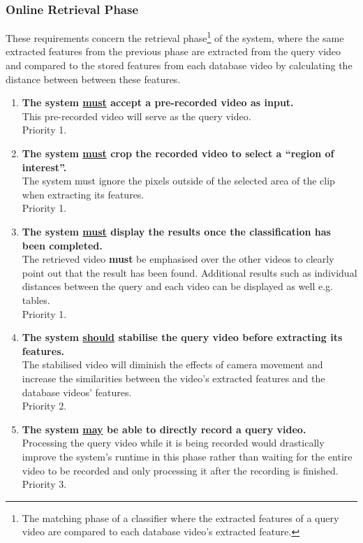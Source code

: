 \subsubsection{Online Retrieval Phase}

These requirements concern the retrieval phase\footnote{The matching phase of a classifier where the extracted features of a query video are compared to each database video's extracted feature.} of the system, where the same extracted features from the previous phase are extracted from the query video and compared to the stored features from each database video by calculating the distance between between these features.

\begin{enumerate}[label=F\arabic*,resume]

    \item \textbf{The system \underline{must} accept a pre-recorded video as input.}\\
    This pre-recorded video will serve as the query video.\\
    Priority 1.
    
    \item \textbf{The system \underline{must} crop the recorded video to select a ``region of interest''.}\\
    The system must ignore the pixels outside of the selected area of the clip when extracting its features.\\
    Priority 1.
    
    \item \textbf{The system \underline{must} display the results once the classification has been completed.}\\
    The retrieved video \textbf{must} be emphasised over the other videos to clearly point out that the result has been found. Additional results such as individual distances between the query and each video can be displayed as well e.g. tables.\\
    Priority 1.
    
    \item \textbf{The system \underline{should} stabilise the query video before extracting its features.}\\
    The stabilised video will diminish the effects of camera movement and increase the similarities between the video's extracted features and the database videos' features.\\
    Priority 2.
    
    \item \textbf{The system \underline{may} be able to directly record a query video.}\\
    Processing the query video while it is being recorded would drastically improve the system's runtime in this phase rather than waiting for the entire video to be recorded and only processing it after the recording is finished.\\
    Priority 3.
    

\end{enumerate}
